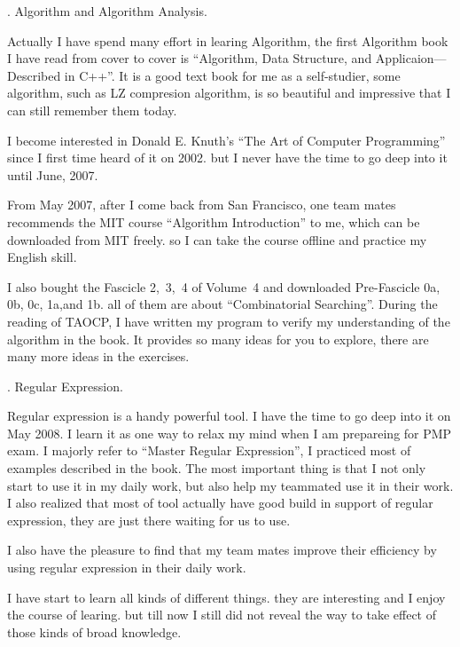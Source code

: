 . Algorithm and Algorithm Analysis.%

Actually I have spend many effort in learing Algorithm, the first Algorithm 
book I have read from cover to cover is ``Algorithm, Data Structure, and 
Applicaion---Described in C++''. It is a good text book for me as a 
self-studier, some algorithm, such as LZ compresion algorithm, is so beautiful
and impressive that I can still remember them today.

I become interested in Donald E. Knuth's ``The Art of Computer Programming'' 
since I first time heard of it on 2002. but I never have the time to go deep into
 it until June, 2007.
 
From May 2007, after I come back from San Francisco, one team mates recommends 
the MIT course ``Algorithm Introduction'' to me, which can be downloaded from
MIT freely. so I can take the course offline and practice my English skill. 

I also bought the Fascicle 2,~3,~4 of Volume~4 and downloaded Pre-Fascicle 0a, 
0b, 0c, 1a,and 1b. all of them are about ``Combinatorial Searching''.
During the reading of TAOCP, I have written my program to verify my 
understanding of the algorithm in the book. It provides so many ideas for you 
to explore, there are many more ideas in the exercises. 

{}. Regular Expression.

Regular expression is a handy powerful tool. I have the time to go deep into it
on May 2008. I learn it as one way to relax my mind when I am prepareing for 
PMP exam. I majorly refer to ``Master Regular Expression'', I practiced most 
of examples described in the book. The most important thing is that I not only 
start to use it in my daily work, but also help my teammated use it in their 
work. I also realized that most of tool actually have good build in
support of regular expression, they are just there waiting for us to use.

I also have the pleasure to find that my team mates improve their efficiency by 
 using regular expression in their daily work.

\par

I have start to learn all kinds of different things. they are interesting and I
enjoy the course of learing. but till now I still did not reveal the way to 
take effect of those kinds of broad knowledge.   
 
 \bye
